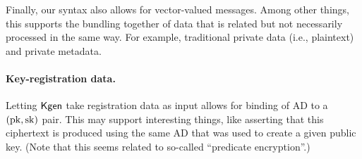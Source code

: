 Finally, our syntax also allows for vector-valued messages.  Among other things, this supports the bundling together of data that is related but not necessarily processed in the same way.  For example, traditional private data (i.e., plaintext) and private metadata.  

 
\paragraph{Key-registration data. } Letting $\mathsf{Kgen}$ take registration data as input allows for binding of AD to a $(\mathrm{pk},\mathrm{sk})$ pair.  This may support interesting things, like asserting that this ciphertext is produced using the same AD that was used to create a given public key.  (Note that this seems related to so-called ``predicate encryption''.)






